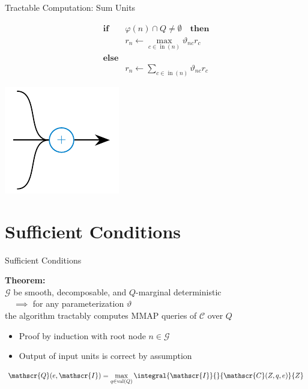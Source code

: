 \documentclass[aspectratio=169]{beamer}
\DeclareMathOperator{\val}{val}
\DeclareMathOperator{\nodein}{in}
\begin{document}
  \begin{frame}{Tractable Computation: Sum Units}
    \begin{minipage}[c]{0.49\textwidth}
      \begin{mybox}
        \begin{align*}
          \mathbf{if}\quad &φ(n) \cap Q \neq \emptyset \quad \mathbf{then} \\
          & r_n \longleftarrow \max_{c\in\nodein(n)} ϑ_{nc}r_c \\
          \mathbf{else} \\
          & r_n \longleftarrow \sum_{c\in\nodein(n)} ϑ_{nc}r_c
        \end{align*}
      \end{mybox}
    \end{minipage}
    \hfill
    \begin{minipage}[c]{0.49\textwidth}
      \center
      \includegraphics[scale=1.2]{figures/sum-unit.pdf}
    \end{minipage}
  \end{frame}

\section{Sufficient Conditions}
  \begin{frame}{Sufficient Conditions}
    \onslide<+->
    \begin{mybox}
      \raggedright
      \textbf{Theorem:}\\[1em]
      $\mathscr{G}$ be smooth, decomposable, and $Q$-marginal deterministic \\
      $\quad\implies$ for any parameterization $ϑ$ \\
      \hphantom{$\quad\implies$} the algorithm tractably computes MMAP queries of $\mathscr{C}$ over $Q$
    \end{mybox}
    \begin{itemize}
      \item<+-> Proof by induction with root node $n\in\mathscr{G}$
      \item<+-> Output of input units is correct by assumption
    \end{itemize}
    \medskip

    \onslide<+->
    \[
      \mathscr{Q}(e,\mathscr{I}) = \max_{q\in\val(Q)} \integral{\mathscr{I}}{}{\mathscr{C}(Z,q,e)}{Z}
    \]
  \end{frame}
\end{document}

